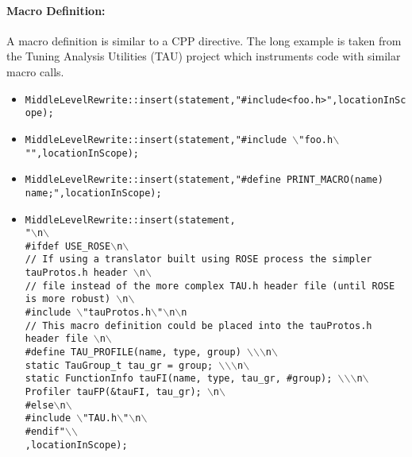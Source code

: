 \paragraph{Macro Definition:}
   A macro definition is similar to a CPP directive. The long example is taken from the
Tuning Analysis Utilities (TAU) project which instruments code with similar macro calls.
\begin{itemize}
   \item {\tt MiddleLevelRewrite::insert(statement,"\#include<foo.h>",locationInScope);}
   \item {\tt MiddleLevelRewrite::insert(statement,"\#include $\backslash$"foo.h$\backslash$"",locationInScope);}
   \item {\tt MiddleLevelRewrite::insert(statement,"\#define PRINT\_MACRO(name) name;",locationInScope);}
   \item {\tt MiddleLevelRewrite::insert(statement,\\
"$\backslash$n$\backslash$\\
\#ifdef USE\_ROSE$\backslash$n$\backslash$\\
// If using a translator built using ROSE process the simpler tauProtos.h header  $\backslash$n$\backslash$\\
// file instead of the more complex TAU.h header file (until ROSE is more robust) $\backslash$n$\backslash$\\
   \#include $\backslash$"tauProtos.h$\backslash$"$\backslash$n$\backslash$n\\
// This macro definition could be placed into the tauProtos.h header file $\backslash$n$\backslash$\\
   \#define TAU\_PROFILE(name, type, group) $\backslash$$\backslash$$\backslash$n$\backslash$\\
        static TauGroup\_t tau\_gr = group; $\backslash$$\backslash$$\backslash$n$\backslash$\\
        static FunctionInfo tauFI(name, type, tau\_gr, \#group); $\backslash$$\backslash$$\backslash$n$\backslash$\\
        Profiler tauFP(\&tauFI, tau\_gr); $\backslash$n$\backslash$\\
\#else$\backslash$n$\backslash$\\
   \#include $\backslash$"TAU.h$\backslash$"$\backslash$n$\backslash$\\
\#endif"$\backslash$$\backslash$\\
,locationInScope);}
\end{itemize}

